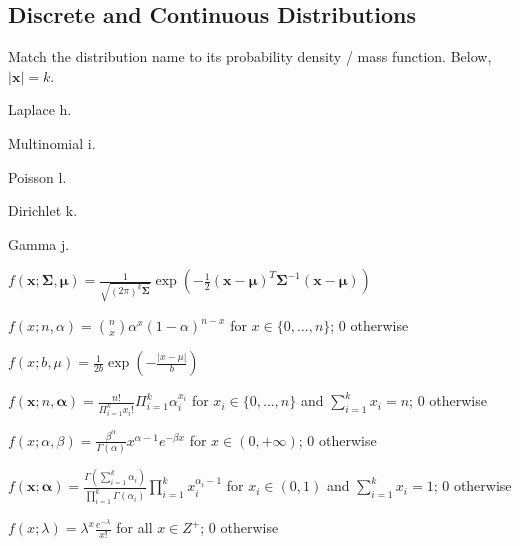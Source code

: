\documentclass[a4paper]{article}
\theoremstyle{definition}
\newcommand{\vc}[1]{\boldsymbol{#1}}
\newcommand{\xv}{\vc{x}}
\newcommand{\Sigmav}{\vc{\Sigma}}
\newcommand{\alphav}{\vc{\alpha}}
\newcommand{\muv}{\vc{\mu}}
\newenvironment{soln}{
    \leavevmode\color{blue}\ignorespaces
}{}
\begin{document}
\subsection{Discrete and Continuous Distributions}
Match the distribution name to its probability density / mass
function. Below, $|\xv| = k$.
\begin{enumerate}[(a)]
\begin{minipage}{0.3\linewidth}
    \item Laplace \begin{soln}  h. \end{soln}
    \item Multinomial \begin{soln}  i. \end{soln}
    \item Poisson \begin{soln}  l. \end{soln}
    \item Dirichlet \begin{soln}  k. \end{soln}
    \item Gamma \begin{soln}  j. \end{soln}
\end{minipage}
\begin{minipage}{0.5\linewidth}
    \item $f(\xv; \Sigmav, \muv) = \frac{1}{\sqrt{(2\pi)^k \Sigmav}} \exp\left( -\frac{1}{2}
        (\xv - \muv)^T \Sigmav^{-1} (\xv - \muv)  \right)$
    \item $f(x; n, \alpha) = \binom{n}{x} \alpha^x (1 - \alpha)^{n-x}$
      for $x \in \{0,\ldots, n\}$; $0$ otherwise
    \item $f(x; b, \mu) = \frac{1}{2b} \exp\left( - \frac{|x - \mu|}{b} \right)$
    \item $f(\xv; n, \alphav) = \frac{n!}{\Pi_{i=1}^k x_i!}
      \Pi_{i=1}^k \alpha_i^{x_i}$ for $x_i \in \{0,\ldots,n\}$ and
      $\sum_{i=1}^k x_i = n$; $0$ otherwise
    \item $f(x; \alpha, \beta) = \frac{\beta^{\alpha}}{\Gamma(\alpha)} x^{\alpha -
        1}e^{-\beta x}$ for $x \in (0,+\infty)$; $0$ otherwise
    \item $f(\xv; \alphav) = \frac{\Gamma(\sum_{i=1}^k
        \alpha_i)}{\prod_{i=1}^k \Gamma(\alpha_i)} \prod_{i=1}^{k}
      x_i^{\alpha_i - 1}$ for $x_i \in (0,1)$ and $\sum_{i=1}^k x_i =
      1$; 0 otherwise
    \item $f(x; \lambda) = \lambda^x \frac{e^{-\lambda}}{x!}$ for all
      $x \in Z^+$; $0$ otherwise
\end{minipage}
\end{enumerate}
        
\end{document}
